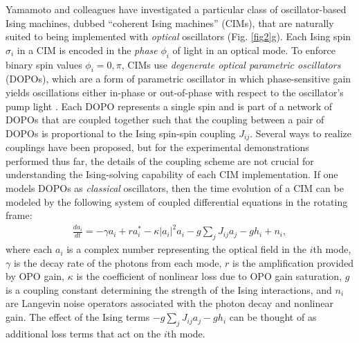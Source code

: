 \documentclass[fleqn,10pt]{wlscirep}
\def\change#1{#1}
\begin{document}
Yamamoto and colleagues have investigated a particular class of oscillator-based Ising machines, dubbed ``coherent Ising machines'' (CIMs), that are naturally suited to being implemented with {\it optical} oscillators\cite{utsunomiya2011mapping,wang2013coherent,marandi2014network,mcmahon2016fully,inagaki2016coherent,yamamoto2017coherent,leleu2019destabilization,hamerly2019experimental,yamamoto2020coherent,honjo2021spin} (Fig. \ref{fig2}g). Each Ising spin $\sigma_i$ in a CIM is encoded in the \textit{phase} $\phi_i$ of light in an optical mode. To enforce binary spin values $\phi_i = 0,\pi$, CIMs use \textit{degenerate optical parametric oscillators} (DOPOs), which are a form of parametric oscillator in which phase-sensitive gain yields oscillations either in-phase or out-of-phase with respect to the oscillator's pump light \cite{wang2013coherent,marandi2012all}. Each DOPO represents a single spin and is part of a network of DOPOs that are coupled together such that the coupling between a pair of DOPOs 
is proportional to the Ising spin-spin coupling $J_{ij}$. Several ways to realize couplings have been proposed\cite{byrnes2011accelerated,wang2013coherent,marandi2014network,mcmahon2016fully,inagaki2016coherent}, but for the experimental demonstrations performed thus far, the details of the coupling scheme are not crucial for understanding the Ising-solving capability of each CIM implementation. If one models DOPOs as \textit{classical} oscillators, then the time evolution of a CIM can be modeled by the following system of coupled differential equations in the rotating frame:\cite{wang2013coherent,yamamoto2017coherent}
%
\begin{align}
\frac{d a_i}{dt} = -\gamma a_i + r a_i^* -\kappa | a_i |^2 a_i - g \sum_{j} J_{ij} a_j - g h_i + n_i,
\label{eq:conttime_CIM}
\end{align}
%
where each $ a_i $ is a complex number representing the optical field in the $i$th mode, $ \gamma $ is the decay rate of the photons from each mode, $r$ is the amplification provided by OPO gain, $\kappa$ is the coefficient of nonlinear loss due to OPO gain saturation, \change{$g$ is a coupling constant determining the strength of the Ising interactions}, and $ n_i $ are Langevin noise operators associated with the photon decay and nonlinear gain. The effect of the Ising terms $-g \sum_{j} J_{ij} a_j - g h_i$ can be thought of as additional loss terms that act on the $i$th mode. 
\end{document}
